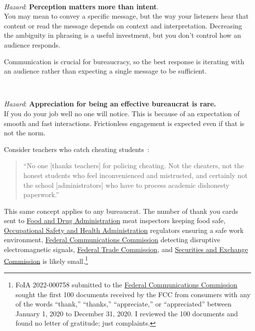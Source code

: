 \ \\
\begin{samepage}
\textit{Hazard}: \textbf{Perception matters more than intent}. \\
You may mean to convey a specific message, but the way your listeners hear that content or read the message depends on context and interpretation. 
Decreasing the ambiguity in phrasing is a useful investment, but you don't control how an audience responds. 

Communication is crucial for bureaucracy, so the best response is iterating with an audience rather than expecting a single message to be sufficient. 
\end{samepage}

\ \\
\begin{samepage}
\textit{Hazard}: \textbf{Appreciation for being an effective bureaucrat is rare.}\\
If you do your job well no one will notice. This is because of an expectation of smooth and fast interactions. Frictionless engagement is expected even if that is not the norm. 

Consider teachers who catch cheating students~\cite{2022_unknown}:
\begin{quote}
``No one [thanks teachers] for policing cheating. Not the cheaters, not the honest students who feel inconvenienced and mistrusted, and certainly not the school [administrators] who have to process academic dishonesty paperwork.''
\end{quote}
\end{samepage}

This same concept applies to any bureaucrat. The number of thank you cards sent to \href{https://www.fda.gov/}{Food and Drug Administration} meat inspectors keeping food safe, \href{https://www.osha.gov/}{Occupational Safety and Health Administration} regulators ensuring a safe work environment, \href{https://www.fcc.gov/}{Federal Communications Commission} detecting disruptive electromagnetic signals, \href{https://www.ftc.gov/}{Federal Trade Commission}, and \href{https://www.sec.gov/}{Securities and Exchange Commission} is likely small.\footnote{FoIA 2022-000758 submitted to the \href{https://www.fcc.gov/}{Federal Communications Commission}  
sought the first 100 documents received by the FCC from consumers with any of the words ``thank,'' ``thanks,'' ``appreciate,'' or ``appreciated'' between January 1, 2020 to December 31, 2020. 
I reviewed the 100 documents and found no letter of gratitude; just complaints.}

